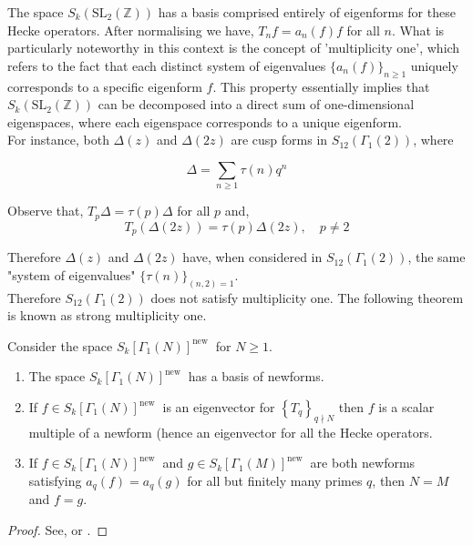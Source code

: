  The space \( S_{k}(\mathrm{SL}_{2}(\mathbb{Z})) \) has a basis comprised entirely of eigenforms for these Hecke operators. After normalising we have, \( T_{n} f = a_{n}(f) f \) for all \( n \). What is particularly noteworthy in this context is the concept of 'multiplicity one', which refers to the fact that each distinct system of eigenvalues \( \{a_{n}(f)\}_{n \geq 1} \) uniquely corresponds to a specific eigenform \( f \). This property essentially implies that \( S_{k}(\mathrm{SL}_{2}(\mathbb{Z})) \) can be decomposed into a direct sum of one-dimensional eigenspaces, where each eigenspace corresponds to a unique eigenform. \\

 For instance, both $\Delta(z)$ and $\Delta(2 z)$ are cusp forms in $S_{12}\left(\Gamma_{1}(2)\right)$, where

$$
\Delta=\sum_{n \geq 1} \tau(n) q^{n}
$$

Observe that, $T_{p} \Delta=\tau(p) \Delta$ for all $p$ and, 
$$
T_{p}(\Delta(2 z))=\tau(p) \Delta(2 z), \quad p \neq 2
$$

Therefore $\Delta(z)$ and $\Delta(2 z)$ have, when considered in $S_{12}\left(\Gamma_{1}(2)\right)$, the same "system of eigenvalues" $\{\tau(n)\}_{(n, 2)=1}$. \\ Therefore $S_{12}\left(\Gamma_{1}(2)\right)$ does not satisfy multiplicity one.
The following theorem is known as strong multiplicity one. 

\begin{theorem}
Consider the space $S_{k}\left[\Gamma_{1}(N)\right]^{\text {new }}$ for $N \geq 1$.

\begin{enumerate}
  \item The space $S_{k}\left[\Gamma_{1}(N)\right]^{\text {new }}$ has a basis of newforms.

  \item If $f \in S_{k}\left[\Gamma_{1}(N)\right]^{\text {new }}$ is an eigenvector for $\left\{T_{q}\right\}_{q \nmid N}$ then $f$ is a scalar multiple of a newform (hence an eigenvector for all the Hecke operators.

  \item If $f \in S_{k}\left[\Gamma_{1}(N)\right]^{\text {new }}$ and $g \in S_{k}\left[\Gamma_{1}(M)\right]^{\text {new }}$ are both newforms satisfying $a_{q}(f)=a_{q}(g)$ for all but finitely many primes $q$, then $N=M$ and $f=g$.

\end{enumerate}

    \begin{proof}
       See, \cite{diamond2005first} or \cite{atkin1970lehner}.
    \end{proof}
\end{theorem}

